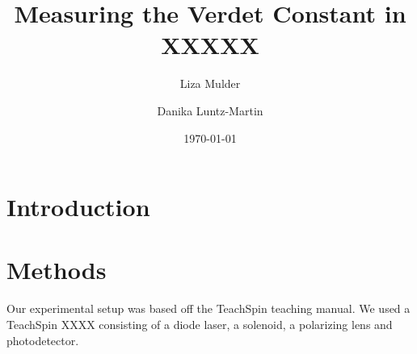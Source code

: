 \documentclass[prb,preprint]{revtex4-1}
\begin{document}

\title{Measuring the Verdet Constant in XXXXX}


\author{Liza Mulder}


\author{Danika Luntz-Martin}


\date{\today}



\begin{abstract}

\end{abstract}

\maketitle %


\section{Introduction} %

\section{Methods}

Our experimental setup was based off the TeachSpin teaching manual. We used a TeachSpin XXXX consisting of a diode laser, a solenoid, a polarizing lens and photodetector. 
\end{document}
